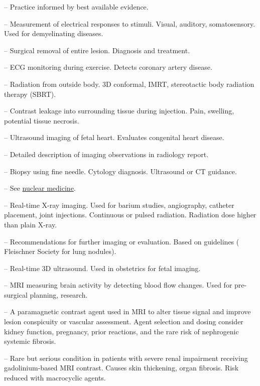 -- Practice informed by best available evidence.

-- Measurement of electrical responses to stimuli. Visual, auditory, somatosensory. Used for demyelinating diseases.

-- Surgical removal of entire lesion. Diagnosis and treatment.

-- ECG monitoring during exercise. Detects coronary artery disease.

-- Radiation from outside body. 3D conformal, IMRT, stereotactic body radiation therapy (SBRT).

-- Contrast leakage into surrounding tissue during injection. Pain, swelling, potential tissue necrosis.

-- Ultrasound imaging of fetal heart. Evaluates congenital heart disease.

-- Detailed description of imaging observations in radiology report.

-- Biopsy using fine needle. Cytology diagnosis. Ultrasound or CT guidance.

-- See \hyperlink{Nuclear Medicine}{nuclear medicine}.

-- Real-time X-ray imaging. Used for barium studies, angiography, catheter placement, joint injections. Continuous or pulsed radiation. Radiation dose higher than plain X-ray.

-- Recommendations for further imaging or evaluation. Based on guidelines ( Fleischner Society for lung nodules).

-- Real-time 3D ultrasound. Used in obstetrics for fetal imaging.


-- MRI measuring brain activity by detecting blood flow changes. Used for pre-surgical planning, research.

-- A paramagnetic contrast agent used in MRI to alter tissue signal and improve lesion conspicuity or vascular assessment. Agent selection and dosing consider kidney function, pregnancy, prior reactions, and the rare risk of nephrogenic systemic fibrosis.

-- Rare but serious condition in patients with severe renal impairment receiving gadolinium-based MRI contrast. Causes skin thickening, organ fibrosis. Risk reduced with macrocyclic agents.

